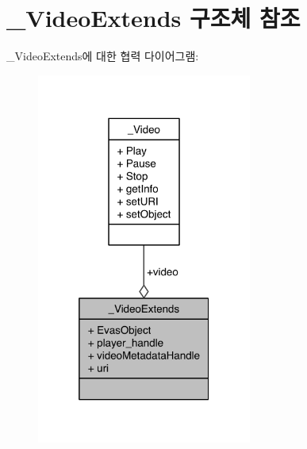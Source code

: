 \hypertarget{struct__VideoExtends}{\section{\-\_\-\-Video\-Extends 구조체 참조}
\label{struct__VideoExtends}
}


\-\_\-\-Video\-Extends에 대한 협력 다이어그램\-:\nopagebreak
\begin{figure}[H]
\begin{center}
\leavevmode
\includegraphics[width=200pt]{d0/da8/struct__VideoExtends__coll__graph}
\end{center}
\end{figure}
